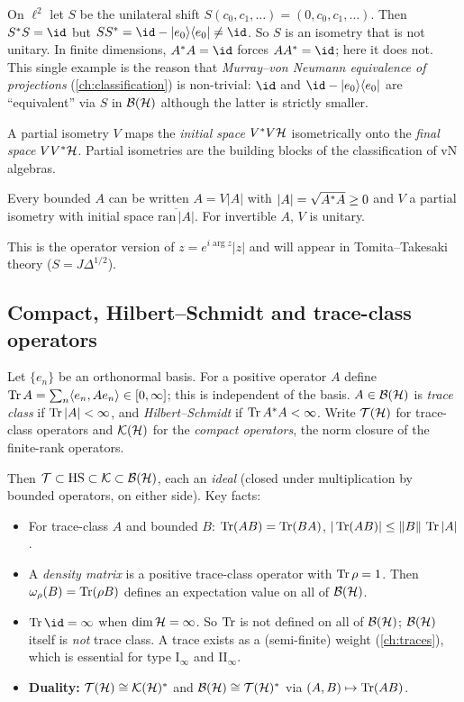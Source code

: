 \begin{example}
On $\ell^2$ let $S$ be the unilateral shift $S(c_0,c_1,\dots)=(0,c_0,c_1,\dots)$. Then $S\ad S=\id$ but $SS\ad=\id-\ketbra{e_0}{e_0}\neq\id$. So $S$ is an isometry that is not unitary. In finite dimensions, $A\ad A=\id$ forces $AA\ad=\id$; here it does not. This single example is the reason that \emph{Murray--von Neumann equivalence of projections} (\cref{ch:classification}) is non-trivial: $\id$ and $\id-\ketbra{e_0}{e_0}$ are ``equivalent'' via $S$ in $\mathcal{B}(\mathcal{H})$ although the latter is strictly smaller.
\end{example}

A partial isometry $V$ maps the \emph{initial space} $V^{*} V\mathcal{H}$ isometrically onto the \emph{final space} $VV^{*}\mathcal{H}$. Partial isometries are the building blocks of the classification of vN algebras.

\begin{theorem}
Every bounded $A$ can be written $A=V|A|$ with $|A|=\sqrt{A^{*} A}\ge0$ and $V$ a partial isometry with initial space $\overline{\mathrm{ran}\,|A|}$. For invertible $A$, $V$ is unitary.
\end{theorem}
This is the operator version of $z=e^{i\arg z}|z|$ and will appear in Tomita--Takesaki theory ($S=J\Delta^{1/2}$).

\subsection{Compact, Hilbert--Schmidt and trace-class operators}

\begin{definition}
Let $\{e_n\}$ be an orthonormal basis. For a positive operator $A$ define $\operatorname{Tr} A=\sum_n\langle e_n,Ae_n\rangle\in[0,\infty]$; this is independent of the basis. $A\in\mathcal{B}(\mathcal{H})$ is \emph{trace class} if $\operatorname{Tr}|A|<\infty$, and \emph{Hilbert--Schmidt} if $\operatorname{Tr} A^{*} A<\infty$. Write $\mathcal T(\mathcal{H})$ for trace-class operators and $\mathcal K(\mathcal{H})$ for the \emph{compact operators}, the norm closure of the finite-rank operators.
\end{definition}

Then $\mathcal T\subset\mathrm{HS}\subset\mathcal K\subset\mathcal{B}(\mathcal{H})$, each an \emph{ideal} (closed under multiplication by bounded operators, on either side). Key facts:
\begin{itemize}
\item For trace-class $A$ and bounded $B$: $\operatorname{Tr}(AB)=\operatorname{Tr}(BA)$, $|\operatorname{Tr}(AB)|\le\lVert B\rVert\,\operatorname{Tr}|A|$.
\item A \emph{density matrix} is a positive trace-class operator with $\operatorname{Tr}\rho=1$. Then $\omega_\rho(B)=\operatorname{Tr}(\rho B)$ defines an expectation value on all of $\mathcal{B}(\mathcal{H})$.
\item $\Tr\id=\infty$ when $\dim\mathcal{H}=\infty$. So $\operatorname{Tr}$ is not defined on all of $\mathcal{B}(\mathcal{H})$; $\mathcal{B}(\mathcal{H})$ itself is \emph{not} trace class. A trace exists as a (semi-finite) weight (\cref{ch:traces}), which is essential for type I$_\infty$ and II$_\infty$.
\item \textbf{Duality:} $\mathcal T(\mathcal{H})\cong\mathcal K(\mathcal{H})^*$ and $\mathcal{B}(\mathcal{H})\cong\mathcal T(\mathcal{H})^*$ via $(A,B)\mapsto\operatorname{Tr}(AB)$.
\end{itemize}

